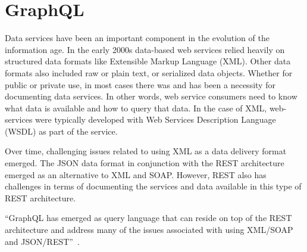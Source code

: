 \section{GraphQL}

Data services have been an important component in the evolution of the
information age.  In the early 2000s data-based web services relied
heavily on structured data formats like Extensible Markup
Language (XML).  Other data formats also included raw or plain text, or
serialized data objects.  Whether for public or private use, in most
cases there was and has been a necessity for documenting data
services.  In other words, web service consumers need to know what
data is available and how to query that data.  In the case of XML,
web-services were typically developed with
Web Services Description Language (WSDL)\cite{hid-sp18-505-WSDL2018} as part
of the service.

Over time, challenging issues related to using XML as a data delivery format
emerged.  The JSON\cite{hid-sp18-505-JSON2018} data format in
conjunction with the REST\cite{hid-sp18-505-REST2018} architecture emerged
as an alternative to XML and SOAP.  However, REST also has challenges in terms
of documenting the services and data available in this type of REST
architecture.

``GraphQL has emerged as query language that can reside on top of the REST
architecture and address many of the issues associated with using XML/SOAP and
JSON/REST''~\cite{hid-sp18-505-GraphQL2018}.
